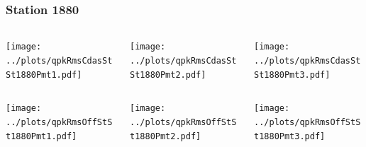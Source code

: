 \documentclass[aspectratio=169]{beamer}
\begin{document}
\begin{frame} 
  \frametitle{Station 1880}
  \begin{center}
    \begin{columns}
      \begin{column}{0.33\textwidth}
        \texttt{[image: ../plots/qpkRmsCdasStSt1880Pmt1.pdf]}
      \end{column}
      \begin{column}{0.33\textwidth}
        \texttt{[image: ../plots/qpkRmsCdasStSt1880Pmt2.pdf]}
      \end{column}
      \begin{column}{0.33\textwidth}
        \texttt{[image: ../plots/qpkRmsCdasStSt1880Pmt3.pdf]}
      \end{column}
    \end{columns}
  \end{center}

  \begin{center}
    \begin{columns}
      \begin{column}{0.33\textwidth}
        \texttt{[image: ../plots/qpkRmsOffStSt1880Pmt1.pdf]}
      \end{column}
      \begin{column}{0.33\textwidth}
        \texttt{[image: ../plots/qpkRmsOffStSt1880Pmt2.pdf]}
      \end{column}
      \begin{column}{0.33\textwidth}
        \texttt{[image: ../plots/qpkRmsOffStSt1880Pmt3.pdf]}
      \end{column}
    \end{columns}
  \end{center}
\end{frame}
\end{document}
